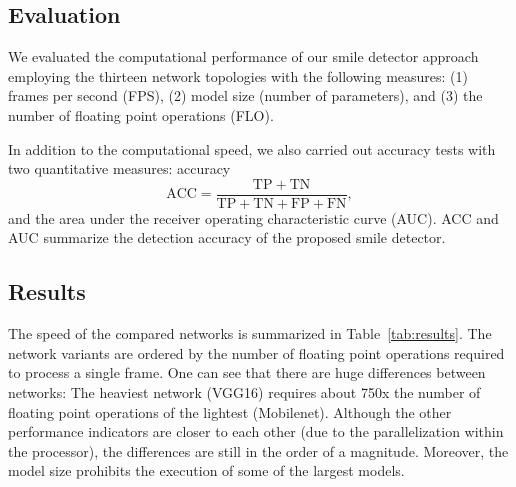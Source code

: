 \documentclass[conference]{IEEEtran}
\begin{document}
\subsection{Evaluation}

We evaluated the computational performance of our smile detector approach employing the thirteen network topologies with the following measures: (1) frames per second (FPS), (2) model size (number of parameters), and (3) the number of floating point operations (FLO).

In addition to the computational speed, we also carried out  accuracy tests with  two quantitative measures: accuracy
\[
\mathrm{ACC} = \frac{\mathrm{TP} + \mathrm{TN}}{\mathrm{TP} + \mathrm{TN} + \mathrm{FP} + \mathrm{FN}},
\]
and the area under the receiver operating characteristic curve (AUC). ACC and AUC summarize the detection accuracy of the proposed smile detector.%




\subsection{Results}

The speed of the compared networks is summarized in Table~\ref{tab:results}. The network variants are ordered by the number of floating point operations required to process a single frame. One can see that there are huge differences between networks: The heaviest network (VGG16) requires about 750x the number of floating point operations of the lightest (Mobilenet). Although the other performance indicators are closer to each other (due to the parallelization within the processor), the differences are still in the order of a magnitude. Moreover, the model size prohibits the execution of some of the largest models.

\end{document}
